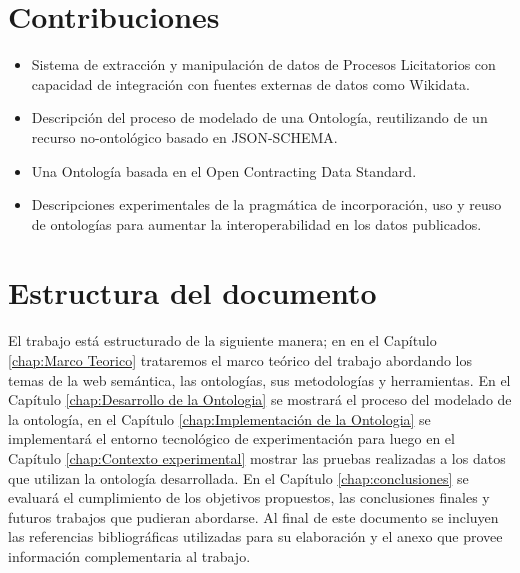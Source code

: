 \section{Contribuciones}
\label{Contribuciones}
\begin{itemize}
\item \label{contrib:1}Sistema de extracción y manipulación de datos de Procesos Licitatorios con capacidad de integración con fuentes externas de datos como Wikidata.
\item \label{contrib:2}Descripción del proceso de modelado de una Ontología, reutilizando de un recurso no-ontológico basado en JSON-SCHEMA.
\item \label{contrib:3}Una Ontología basada en el Open Contracting Data Standard.
\item \label{contrib:4}Descripciones experimentales de la pragmática de incorporación, uso y reuso de ontologías para aumentar la interoperabilidad en los datos publicados.

\end{itemize}
 

\section{Estructura del documento}
El trabajo está estructurado de la siguiente manera; en  en el  Capítulo \ref{chap:Marco Teorico}  trataremos el marco teórico del trabajo abordando los temas de la web semántica, las ontologías, sus metodologías y herramientas. En el Capítulo \ref{chap:Desarrollo de la Ontologia} se mostrará el proceso del modelado de la ontología, en el Capítulo \ref{chap:Implementación de la Ontologia} se implementará el entorno tecnológico de experimentación para luego en el Capítulo  \ref{chap:Contexto experimental} mostrar las pruebas realizadas a los datos que utilizan la ontología desarrollada. En el Capítulo \ref{chap:conclusiones} se evaluará el cumplimiento de los objetivos propuestos, las conclusiones finales y futuros trabajos que pudieran abordarse. Al final de este documento  se  incluyen las referencias bibliográficas utilizadas para su elaboración y el anexo que provee información complementaria al trabajo.


